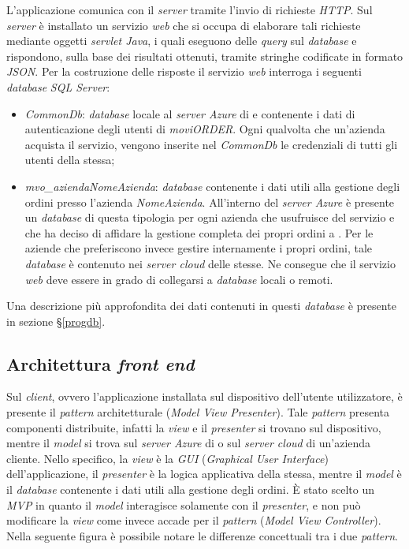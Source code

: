 L'applicazione comunica con il \textit{server} tramite l'invio di richieste \textit{HTTP}. Sul \textit{server} è installato un servizio \textit{web} che si occupa di elaborare tali richieste mediante oggetti \textit{servlet Java}, i quali eseguono delle \textit{query} sul \textit{database} e rispondono, sulla base dei risultati ottenuti, tramite stringhe codificate in formato \textit{JSON}. Per la costruzione delle risposte il servizio \textit{web} interroga i seguenti \textit{database} \textit{SQL Server}:
\begin{itemize}
	\item \textit{CommonDb}: \textit{database} locale al \textit{server Azure} di \visione{} e contenente i dati di autenticazione degli utenti di \textit{moviORDER}. Ogni qualvolta che un'azienda acquista il servizio, vengono inserite nel \textit{CommonDb} le credenziali di tutti gli utenti della stessa;
	\item \textit{mvo\_aziendaNomeAzienda}: \textit{database} contenente i dati utili alla gestione degli ordini presso l'azienda \textit{NomeAzienda}. All'interno del \textit{server Azure} è presente un \textit{database} di questa tipologia per ogni azienda che usufruisce del servizio e che ha deciso di affidare la gestione completa dei propri ordini a \visione{}. Per le aziende che preferiscono invece gestire internamente i propri ordini, tale \textit{database} è contenuto nei \textit{server cloud} delle stesse. Ne consegue che il servizio \textit{web} deve essere in grado di collegarsi a \textit{database} locali o remoti.
\end{itemize}
Una descrizione più approfondita dei dati contenuti in questi \textit{database} è presente in sezione §\ref{progdb}.

\subsection{Architettura \textit{front end}}

Sul \textit{client}, ovvero l'applicazione installata sul dispositivo dell'utente utilizzatore, è presente il \textit{pattern} architetturale  (\textit{Model View Presenter}). Tale \textit{pattern} presenta componenti distribuite, infatti la \textit{view} e il \textit{presenter} si trovano sul dispositivo, mentre il \textit{model} si trova sul \textit{server Azure} di \visione{} o sul \textit{server cloud} di un'azienda cliente. Nello specifico, la \textit{view} è la \textit{GUI} (\textit{Graphical User Interface}) dell'applicazione, il \textit{presenter} è la logica applicativa della stessa, mentre il \textit{model} è il \textit{database} contenente i dati utili alla gestione degli ordini. È stato scelto un \textit{MVP} in quanto il \textit{model} interagisce solamente con il \textit{presenter}, e non può modificare la \textit{view} come invece accade per il \textit{pattern}  (\textit{Model View Controller}). Nella seguente figura è possibile notare le differenze concettuali tra i due \textit{pattern}.


